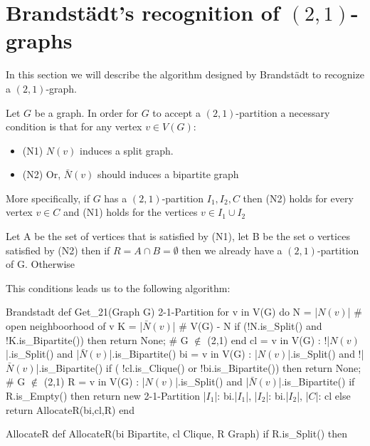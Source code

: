 \section{Brandstädt's recognition of $(2,1)$-graphs}

In this section we will describe the algorithm designed by Brandstädt to recognize a $(2,1)$-graph.

Let $G$ be a graph. In order for $G$ to accept a $(2,1)$-partition a necessary condition is that for any vertex $v \in V(G)$:

\begin{itemize}
\item (N1) $N(v)$ induces a split graph.
\item (N2) Or, $\bar{N}(v)$ should induces a bipartite graph
\end{itemize}

More specifically, if $G$ has a $(2,1)$-partition $I_1,I_2,C$ then (N2) holds for every vertex $v \in C$ and (N1) holds for the vertices $v \in I_1 \cup I_2$

Let A be the set of vertices that is satisfied by (N1), let B be the set o vertices satisfied by (N2) then if $R=A \cap B=\emptyset$ then we already have a $(2,1)$-partition of G. Otherwise 



This conditions leads us to the following algorithm:


\begin{code}{Brandstadt}
  def Get_21(Graph G) 2-1-Partition
    for v in V(G) do
      N = |$N(v)$| # open neighboorhood of v
      K = |$\bar{N}(v)$| # V(G) - N
      if (!N.is_Split() and !K.is_Bipartite()) then
        return None; # G $\notin$ (2,1)
    end
    cl = { v in V(G) : !|$N(v)$|.is_Split() and |$\bar{N}(v)$|.is_Bipartite() }
    bi = { v in V(G) : |$N(v)$|.is_Split() and !|$\bar{N}(v)$|.is_Bipartite() }
    if ( !cl.is_Clique() or !bi.is_Bipartite()) then
      return None; # G $\notin$ (2,1)
    R = {v in V(G) : |$N(v)$|.is_Split() and |$\bar{N}(v)$|.is_Bipartite()}
    if R.is_Empty() then
      return new 2-1-Partition {
        |$I_1$|: bi.|$I_1$|,
        |$I_2$|: bi.|$I_2$|,
        |$C$|: cl
      }
    else return AllocateR(bi,cl,R)
  end
\end{code}

\begin{code}{AllocateR}
  def AllocateR(bi Bipartite, cl Clique, R Graph)
    if R.is_Split() then
      

\end{code}

